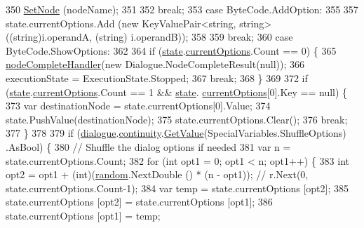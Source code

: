 \begin{DoxyCode}
350                 \hyperlink{a00152_a6364593ea1115d65e34b343422cfbbbd}{SetNode} (nodeName);
351 
352                 \textcolor{keywordflow}{break};
353             \textcolor{keywordflow}{case} ByteCode.AddOption:
355 
357                 state.currentOptions.Add (\textcolor{keyword}{new} KeyValuePair<string, string> ((string)i.operandA, (\textcolor{keywordtype}{string})
      i.operandB));
358 
359                 \textcolor{keywordflow}{break};
360             \textcolor{keywordflow}{case} ByteCode.ShowOptions:
362 
364                 \textcolor{keywordflow}{if} (\hyperlink{a00152_a70f2ce6201cdd2430ceaa764ac614ca0}{state}.\hyperlink{a00155_ab816dfea32ecda23282700f01454e0a9}{currentOptions}.Count == 0) \{
365                     \hyperlink{a00152_a5129c63e67e2d4e2780d86b8351320a2}{nodeCompleteHandler}(\textcolor{keyword}{new} Dialogue.NodeCompleteResult(null));
366                     executionState = ExecutionState.Stopped;
367                     \textcolor{keywordflow}{break};
368                 \}
369 
372                 \textcolor{keywordflow}{if} (\hyperlink{a00152_a70f2ce6201cdd2430ceaa764ac614ca0}{state}.\hyperlink{a00155_ab816dfea32ecda23282700f01454e0a9}{currentOptions}.Count == 1 && \hyperlink{a00152_a70f2ce6201cdd2430ceaa764ac614ca0}{state}.
      \hyperlink{a00155_ab816dfea32ecda23282700f01454e0a9}{currentOptions}[0].Key == null) \{
373                     var destinationNode = state.currentOptions[0].Value;
374                     state.PushValue(destinationNode);
375                     state.currentOptions.Clear();
376                     \textcolor{keywordflow}{break};
377                 \}
378 
379                 \textcolor{keywordflow}{if} (\hyperlink{a00152_ac506426c503da5f033247c29e11c5e82}{dialogue}.\hyperlink{a00082_ae94eaa4b03b432422f5d205fabe37ff5}{continuity}.\hyperlink{a00180_accab1fc5c8fc353dbfc53ca0f4029576}{GetValue}(SpecialVariables.ShuffleOptions)
      .AsBool) \{
380                     \textcolor{comment}{// Shuffle the dialog options if needed}
381                     var n = state.currentOptions.Count;
382                     \textcolor{keywordflow}{for} (\textcolor{keywordtype}{int} opt1 = 0; opt1 < n; opt1++) \{
383                         \textcolor{keywordtype}{int} opt2 = opt1 + (int)(\hyperlink{a00152_a408485a00c7cc558428c86ed9dd04fca}{random}.NextDouble () * (n - opt1)); \textcolor{comment}{// r.Next(0,
       state.currentOptions.Count-1);}
384                         var temp = state.currentOptions [opt2];
385                         state.currentOptions [opt2] = state.currentOptions [opt1];
386                         state.currentOptions [opt1] = temp;

\end{DoxyCode}
